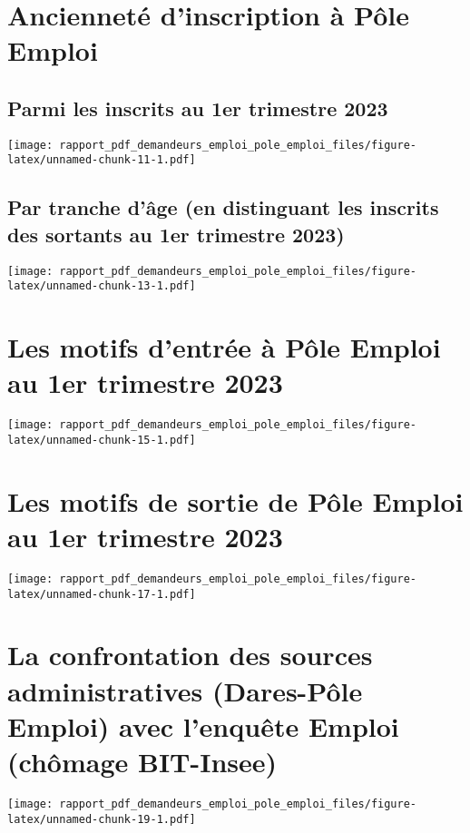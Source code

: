 \documentclass[
  paper=a4,
  ,captions=tableheading
]{scrartcl}
\begin{document}
\hypertarget{anciennetuxe9-dinscription-uxe0-puxf4le-emploi}{%
\section{Ancienneté d'inscription à Pôle
Emploi}\label{anciennetuxe9-dinscription-uxe0-puxf4le-emploi}}

\hypertarget{parmi-les-inscrits-au-1er-trimestre-2023}{%
\subsection{Parmi les inscrits au 1er trimestre
2023}\label{parmi-les-inscrits-au-1er-trimestre-2023}}

\texttt{[image: rapport\_pdf\_demandeurs\_emploi\_pole\_emploi\_files/figure-latex/unnamed-chunk-11-1.pdf]}

\hypertarget{par-tranche-duxe2ge-en-distinguant-les-inscrits-des-sortants-au-1er-trimestre-2023}{%
\subsection{Par tranche d'âge (en distinguant les inscrits des sortants
au 1er trimestre
2023)}\label{par-tranche-duxe2ge-en-distinguant-les-inscrits-des-sortants-au-1er-trimestre-2023}}

\texttt{[image: rapport\_pdf\_demandeurs\_emploi\_pole\_emploi\_files/figure-latex/unnamed-chunk-13-1.pdf]}

\hypertarget{les-motifs-dentruxe9e-uxe0-puxf4le-emploi-au-1er-trimestre-2023}{%
\section{Les motifs d'entrée à Pôle Emploi au 1er trimestre
2023}\label{les-motifs-dentruxe9e-uxe0-puxf4le-emploi-au-1er-trimestre-2023}}

\texttt{[image: rapport\_pdf\_demandeurs\_emploi\_pole\_emploi\_files/figure-latex/unnamed-chunk-15-1.pdf]}

\hypertarget{les-motifs-de-sortie-de-puxf4le-emploi-au-1er-trimestre-2023}{%
\section{Les motifs de sortie de Pôle Emploi au 1er trimestre
2023}\label{les-motifs-de-sortie-de-puxf4le-emploi-au-1er-trimestre-2023}}

\texttt{[image: rapport\_pdf\_demandeurs\_emploi\_pole\_emploi\_files/figure-latex/unnamed-chunk-17-1.pdf]}

\hypertarget{la-confrontation-des-sources-administratives-dares-puxf4le-emploi-avec-lenquuxeate-emploi-chuxf4mage-bit-insee}{%
\section{La confrontation des sources administratives (Dares-Pôle
Emploi) avec l'enquête Emploi (chômage
BIT-Insee)}\label{la-confrontation-des-sources-administratives-dares-puxf4le-emploi-avec-lenquuxeate-emploi-chuxf4mage-bit-insee}}

\texttt{[image: rapport\_pdf\_demandeurs\_emploi\_pole\_emploi\_files/figure-latex/unnamed-chunk-19-1.pdf]}
\end{document}
